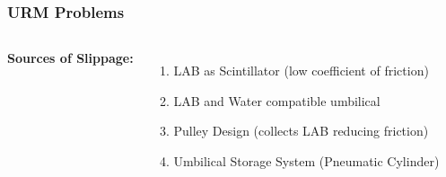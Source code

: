 \documentclass{beamer}
\begin{document}
\begin{frame}
\frametitle{URM Problems}
\begin{columns}[t] %

\textbf{Sources of Slippage:}
\begin{enumerate}
\item LAB as Scintillator (low coefficient of friction)
\item LAB and Water compatible umbilical
\item Pulley Design (collects LAB reducing friction)
\item Umbilical Storage System (Pneumatic Cylinder)
\end{enumerate}



\end{columns}
\end{frame}


\end{document}
